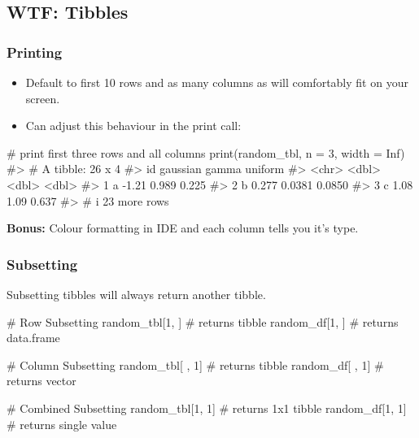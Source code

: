 \documentclass[
  letterpaper,
  DIV=11,
  numbers=noendperiod]{scrreprt}
\newenvironment{Shaded}{\begin{snugshade}}{\end{snugshade}}
\newcommand{\AttributeTok}[1]{\textcolor[rgb]{0.40,0.45,0.13}{#1}}
\newcommand{\CommentTok}[1]{\textcolor[rgb]{0.37,0.37,0.37}{#1}}
\newcommand{\ConstantTok}[1]{\textcolor[rgb]{0.56,0.35,0.01}{#1}}
\newcommand{\DecValTok}[1]{\textcolor[rgb]{0.68,0.00,0.00}{#1}}
\newcommand{\FunctionTok}[1]{\textcolor[rgb]{0.28,0.35,0.67}{#1}}
\newcommand{\NormalTok}[1]{\textcolor[rgb]{0.00,0.23,0.31}{#1}}
\begin{document}
\subsection{WTF: Tibbles}\label{wtf-tibbles}

\subsubsection{Printing}\label{printing}

\begin{itemize}
\item
  Default to first 10 rows and as many columns as will comfortably fit
  on your screen.
\item
  Can adjust this behaviour in the print call:
\end{itemize}

\begin{Shaded}
\begin{Highlighting}[]
\CommentTok{\# print first three rows and all columns}
\FunctionTok{print}\NormalTok{(random\_tbl, }\AttributeTok{n =} \DecValTok{3}\NormalTok{, }\AttributeTok{width =} \ConstantTok{Inf}\NormalTok{)}
\CommentTok{\#\textgreater{} \# A tibble: 26 x 4}
\CommentTok{\#\textgreater{}   id    gaussian  gamma uniform}
\CommentTok{\#\textgreater{}   \textless{}chr\textgreater{}    \textless{}dbl\textgreater{}  \textless{}dbl\textgreater{}   \textless{}dbl\textgreater{}}
\CommentTok{\#\textgreater{} 1 a       {-}1.21  0.989   0.225 }
\CommentTok{\#\textgreater{} 2 b        0.277 0.0381  0.0850}
\CommentTok{\#\textgreater{} 3 c        1.08  1.09    0.637 }
\CommentTok{\#\textgreater{} \# i 23 more rows}
\end{Highlighting}
\end{Shaded}

\textbf{Bonus:} Colour formatting in IDE and each column tells you it's
type.

\subsubsection{Subsetting}\label{subsetting}

Subsetting tibbles will always return another tibble.

\begin{Shaded}
\begin{Highlighting}[]
\CommentTok{\# Row Subsetting}
\NormalTok{random\_tbl[}\DecValTok{1}\NormalTok{, ] }\CommentTok{\# returns tibble}
\NormalTok{random\_df[}\DecValTok{1}\NormalTok{, ]  }\CommentTok{\# returns data.frame}

\CommentTok{\# Column Subsetting}
\NormalTok{random\_tbl[ , }\DecValTok{1}\NormalTok{]      }\CommentTok{\# returns tibble}
\NormalTok{random\_df[ , }\DecValTok{1}\NormalTok{]       }\CommentTok{\# returns vector}

\CommentTok{\# Combined Subsetting}
\NormalTok{random\_tbl[}\DecValTok{1}\NormalTok{, }\DecValTok{1}\NormalTok{]      }\CommentTok{\# returns 1x1 tibble}
\NormalTok{random\_df[}\DecValTok{1}\NormalTok{, }\DecValTok{1}\NormalTok{]       }\CommentTok{\# returns single value}
\end{Highlighting}
\end{Shaded}
\end{document}
